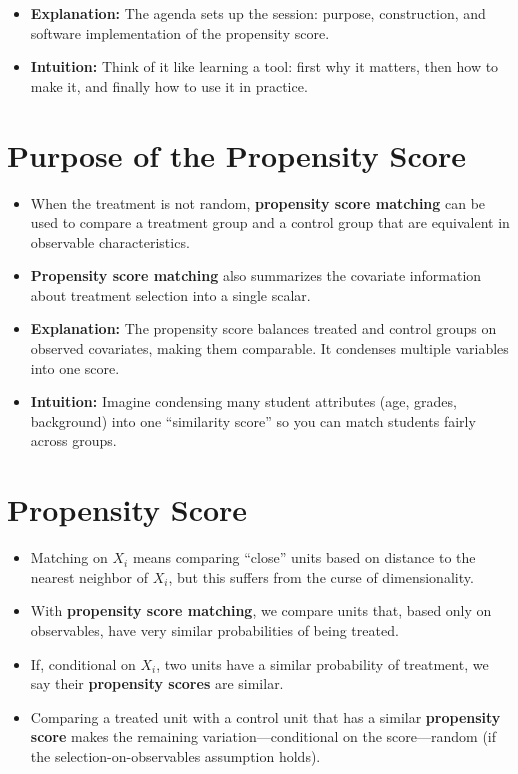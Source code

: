 \documentclass[12pt]{article}
\begin{document}
\begin{itemize}
    \item \textbf{Explanation:} The agenda sets up the session: purpose, construction, and software implementation of the propensity score.
    \item \textbf{Intuition:} Think of it like learning a tool: first why it matters, then how to make it, and finally how to use it in practice.
\end{itemize}

\section*{\noindent\textbf{Purpose of the Propensity Score}}

\begin{itemize}
    \item When the treatment is not random, \textbf{propensity score matching} can be used to compare a treatment group and a control group that are equivalent in observable characteristics.
    \item \textbf{Propensity score matching} also summarizes the covariate information about treatment selection into a single scalar.
\end{itemize}

\begin{itemize}
    \item \textbf{Explanation:} The propensity score balances treated and control groups on observed covariates, making them comparable. It condenses multiple variables into one score.
    \item \textbf{Intuition:} Imagine condensing many student attributes (age, grades, background) into one “similarity score” so you can match students fairly across groups.
\end{itemize}

\section*{\noindent\textbf{Propensity Score}}

\begin{itemize}
    \item Matching on $X_i$ means comparing “close” units based on distance to the nearest neighbor of $X_i$, but this suffers from the curse of dimensionality.
    \item With \textbf{propensity score matching}, we compare units that, based only on observables, have very similar probabilities of being treated.
    \item If, conditional on $X_i$, two units have a similar probability of treatment, we say their \textbf{propensity scores} are similar.
    \item Comparing a treated unit with a control unit that has a similar \textbf{propensity score} makes the remaining variation—conditional on the score—random (if the selection-on-observables assumption holds).
\end{itemize}
\end{document}
